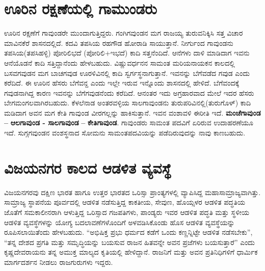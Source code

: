 \section{ಊರಿನ ರಕ್ಷಣೆಯಲ್ಲಿ ಗಾಮುಂಡರು}

ಊರಿನ ರಕ್ಷಣೆಗೆ ಗಾವುಂಡರೇ ಮುಂದಾಗುತ್ತಿದ್ದರು. ಗಂಗಿಗವುಂಡನ ಮಗ ರಾಜಯ್ಯ ತುರುವನಿಕ್ಕಿಸಿ ಸತ್ತ ವಿಚಾರ ಮಾವಿನಕೆರೆ ಶಾಸನದಲ್ಲಿದೆ. ಕದವಿ ತಪಸಿಯ ರಹಗೌಡ ಹೋರಾಡಿ ಸಾಯುತ್ತಾನೆ. ನೀರ್ಗುಂದ ಗಾವುಂಡನು ತಪಸಿಯ(ತಪಸಿಹಳ್ಳಿ) ಪೋರಿಲಿಭದೆ (ಪೋರಿಲಿ+ಇಭದೆ) ಕಾದಿ ಸತ್ತನೆಂದಿದೆ. ಆನೆಗಳು ದಾಳಿ ಮಾಡಿದಾಗ ಇವನು ಆನೆಯೊಡನೆ ಕಾದಿ ಸತ್ತಿದ್ದಾನೆಂದು ಹೇಳಬಹುದು. ವಿಷ್ಣುವರ್ಧನನ ಸಾಮಂತ ಮರಿಯನಾಯಕನ ಕಾಲದಲ್ಲಿ ಬಸವಗವುಡನ ಮಗ ಬಾಚಗವುಡ ಊರಳಿವಿನಲ್ಲಿ ಕಾದಿ ಸ್ವರ್ಗಸ್ಥನಾಗುತ್ತಾನೆ. ಇವನನ್ನು ಬೆಗೆವಡೆದ ಗವುಡ ಎಂದು ಕರೆದಿದೆ. ಈ ಊರಿನ ಹೆಸರು ಬೆಗೆವನ್ದ ಎಂದು ಇಲ್ಲೇ ಇರುವ ಇನ್ನೊಂದು ಶಾಸನದಲ್ಲಿ ಹೇಳಿದೆ. ಬೆಗೆವಂದಕ್ಕೆ ಗವುಡನಾಗಿದ್ದ ಕಾರಣ ಇವನನ್ನು ಬೆಗೆಗವುಡನೆಂದು ಕರೆದಿದೆ. ಆನಂತರ ಇದು ಅಗ್ರಹಾರವಾದ ಮೇಲೆ ಇದರ ಹೆಸರು ಬೇಗಮಂಗಲವಾಗಿರಬಹುದು. ಕೆಳಲೆನಾಡ ಅಂತರವಳ್ಳಿಯ ಸಾಲಗಾವುಂಡನು ತುರುಪರಿವಿನಲ್ಲಿ(ತುರುಗೊಳ್​) ಕಾದಿ ಮಡಿದಾಗ ಅವನ ಮಗ ಕೇತಿ ಗಾವುಂಡ ವೀರಗಲ್ಲನ್ನು ಹಾಕಿಸುತ್ತಾನೆ. ಇವನ ವಂಶಾವಳಿ ಈರೀತಿ ಇದೆ. \textbf{ಮಂಚೆಗಾವುಂಡ } \textbf{–} \textbf{ಆಲಗಾವುಂಡ - ಸಾಲಗಾವುಂಡ} \textbf{–} \textbf{ ಕೇತಿಗಾವುಂಡ}. ಗಾವುಂಡರು ಸಾಮಂತ ಪದವಿಗೆ ಏರಿರುವ ಉದಾಹರಣೆಯೂ ಇದೆ. ಸುಗ್ಗಗವುಂಡನ ವಂಶಸ್ಥನಾದ ಸೋಮನು ಸಾಮಂತಪದವಿಯನ್ನು ಪಡೆದಿರುವುದನ್ನು ನಾವು ಕಾಣಬಹುದು.


\section{ವಿಜಯನಗರ ಕಾಲದ ಆಡಳಿತ ವ್ಯವಸ್ಥೆ}

ವಿಜಯನಗರವು ದಕ್ಷಿಣ ಭಾರತ ಹಾಗೂ ಉತ್ತರ ಭಾರತದ ಒರಿಸ್ಸಾ ಪ್ರಾಂತ್ಯಗಳಲ್ಲಿ ವ್ಯಾಪಿಸಿದ್ದ ಮಹಾಸಾಮ್ರಾಜ್ಯವಾಗಿತ್ತು. ಸಾಮ್ರಾಜ್ಯ ಸ್ಥಾಪನೆಯ ಪೂರ್ವದಲ್ಲಿ ಆಡಳಿತ ನಡೆಸುತ್ತಿದ್ದ ಕಾಕತೀಯ, ಸೇವುಣ, ಹೊಯ್ಸಳರ ಆಡಳಿತ ಪದ್ಧತಿಯ ಜೊತೆಗೆ ಸಮಕಾಲೀನರಾಗಿ ಆಳುತ್ತಿದ್ದ ಒರಿಸ್ಸಾದ ಗಜಪತಿಗಳು, ಪಾಂಡ್ಯರು ಇವರ ಆಡಳಿತ ಪದ್ಧತಿ ಮತ್ತು ಸ್ಥಳೀಯ ಆಡಳಿತ ವ್ಯವಸ್ಥೆಗಳನ್ನು ಯೋಗ್ಯ ಬದಲಾವಣೆಗಳೊಂದಿಗೆ ಅಳವಡಿಸಿಕೊಂಡು ಹೊಸ ಆಡಳಿತ ವ್ಯವಸ್ಥೆಯನ್ನು ರೂಪಿಸಲಾಯಿತೆಂದು ಹೇಳಬಹುದು. “ಅಭಿಷಿಕ್ತ ಪ್ರಭು ಧರ್ಮದ ಕಡೆಗೆ ಒಂದು ಕಣ್ಣನ್ನಿಟ್ಟೇ ಆಡಳಿತ ನಡೆಸಬೇಕು”, “ತನ್ನ ದೇಶದ ಪ್ರಗತಿ ಮತ್ತು ಸಮೃದ್ಧಿಯನ್ನು ಬಯಸುವ ರಾಜನ ಹಿತವನ್ನೇ ಅವನ ಪ್ರಜೆಗಳು ಬಯಸುತ್ತಾರೆ” ಎಂದು ಕೃಷ್ಣದೇವರಾಯನು ತನ್ನ ಅಮುಕ್ತ ಮಾಲ್ಯದ ಕೃತಿಯಲ್ಲಿ ಹೇಳಿದ್ದಾನೆ. ರಾಜನಿಗೆ ಮತ್ತು ಅವನ ಪ್ರತಿನಿಧಿಗಳಿಗೆ ಧಾರ್ಮಿಕ ಮಾರ್ಗದರ್ಶನ ನೀಡಲು ರಾಜಗುರುಗಳು ಇದ್ದರು.

